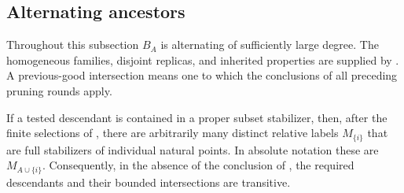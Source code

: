 \subsection{Alternating ancestors}
\label{fa:alternating}
Throughout this subsection \(B_A\) is alternating of sufficiently large degree.  The homogeneous
families, disjoint replicas, and inherited properties are supplied by .  A
previous-good intersection means one to which the conclusions of all preceding pruning rounds apply.

\begin{proposition}\label{fa:subset-points}
If a tested descendant is contained in a proper subset stabilizer, then, after the finite selections of
, there are arbitrarily many distinct relative labels \(M_{\{i\}}\) that are full
stabilizers of individual natural points.  In absolute notation these are \(M_{A\cup\{i\}}\).
Consequently, in the absence of the conclusion of , the required descendants and
their bounded intersections are transitive.
\end{proposition}

